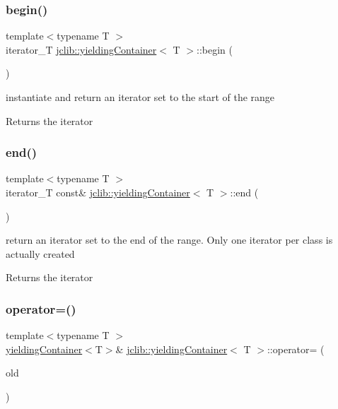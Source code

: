 \subsubsection{\texorpdfstring{begin()}{begin()}}
{\footnotesize\ttfamily template$<$typename T $>$ \\
iterator\+\_\+T \hyperlink{classjclib_1_1yieldingContainer}{jclib\+::yielding\+Container}$<$ T $>$\+::begin (\begin{DoxyParamCaption}{ }\end{DoxyParamCaption})\hspace{0.3cm}{\ttfamily [inline]}}

instantiate and return an iterator set to the start of the range \begin{DoxyReturn}{Returns}
the iterator 
\end{DoxyReturn}
\mbox{\label{classjclib_1_1yieldingContainer_a19f48736c18c516ad711db0255d1894a}} 
\subsubsection{\texorpdfstring{end()}{end()}}
{\footnotesize\ttfamily template$<$typename T $>$ \\
iterator\+\_\+T const\& \hyperlink{classjclib_1_1yieldingContainer}{jclib\+::yielding\+Container}$<$ T $>$\+::end (\begin{DoxyParamCaption}{ }\end{DoxyParamCaption})\hspace{0.3cm}{\ttfamily [inline]}}

return an iterator set to the end of the range. Only one iterator per class is actually created \begin{DoxyReturn}{Returns}
the iterator 
\end{DoxyReturn}
\mbox{\label{classjclib_1_1yieldingContainer_a1c4bd31066ec29559dc7ed6d0801cabe}} 
\subsubsection{\texorpdfstring{operator=()}{operator=()}}
{\footnotesize\ttfamily template$<$typename T $>$ \\
\hyperlink{classjclib_1_1yieldingContainer}{yielding\+Container}$<$T$>$\& \hyperlink{classjclib_1_1yieldingContainer}{jclib\+::yielding\+Container}$<$ T $>$\+::operator= (\begin{DoxyParamCaption}\item[{const \hyperlink{classjclib_1_1yieldingContainer}{yielding\+Container}$<$ T $>$ \&}]{old }\end{DoxyParamCaption})\hspace{0.3cm}{\ttfamily [inline]}}


